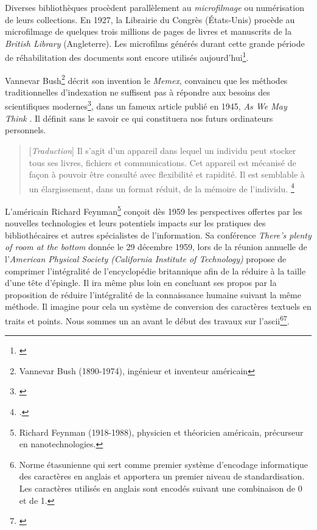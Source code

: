 Diverses bibliothèques procèdent parallèlement au \textit{microfilmage} ou numérisation de leurs collections. En 1927, la Librairie du Congrès (États-Unis) procède au microfilmage de quelques trois millions de pages de livres et manuscrits de la \textit{British Library} (Angleterre). Les microfilms générés durant cette grande période de réhabilitation des documents sont encore utilisés aujourd'hui\footnote{\cite[p. 9]{thylstrup_politics_2018}}.

Vannevar Bush\footnote{Vannevar Bush (1890-1974), ingénieur et inventeur américain} décrit son invention le \textit{Memex}, convaincu que les méthodes traditionnelles d'indexation ne suffisent pas à répondre aux besoins des scientifiques modernes\footnote{\cite[p. 11]{xie_discover_2016}}, dans un fameux article publié en 1945, \og \textit{As We May Think} \fg{}. Il définit sans le savoir ce qui constituera nos futurs ordinateurs personnels.

\begin{quotation}
[\textit{Traduction}]
Il s'agit d'un appareil dans lequel un individu peut stocker tous ses livres, fichiers et communications. Cet appareil est mécanisé de façon à pouvoir être consulté avec flexibilité et rapidité. Il est semblable à un élargissement, dans un format réduit, de la mémoire de l'individu.
 \footnote{\cite[p. 6]{weiss_using_2014}.}
 \end{quotation}

L'américain Richard Feynman\footnote{Richard Feynman (1918-1988), physicien et théoricien américain, précurseur en nanotechnologies.} conçoit dès 1959 les perspectives offertes par les nouvelles technologies et leurs potentiels impacts sur les pratiques des bibliothécaires et autres spécialistes de l'information. Sa conférence \emph{There's plenty of room at the bottom} donnée le 29 décembre 1959, lors de la réunion annuelle de l'\textit{American Physical Society (California Institute of Technology)} propose de comprimer l'intégralité de l'encyclopédie britannique afin de la réduire à la taille d'une tête d'épingle. Il ira même plus loin en concluant ses propos par la proposition de réduire l'intégralité de la connaissance humaine suivant la même méthode. Il imagine pour cela un système de conversion des caractères textuels en traits et points. Nous sommes un an avant le début des travaux sur l'\gls{ascii}\footnote{Norme étasunienne qui sert comme premier système d'encodage informatique des caractères en anglais et apportera un premier niveau de standardisation. Les caractères utilisés en anglais sont encodés suivant une combinaison de 0 et de 1.}\footnote{\cite[p. 25]{association_pour_le_patrimoine_naturel_et_culturel_du_canton_de_vaud_patrimoine_2012}}.

